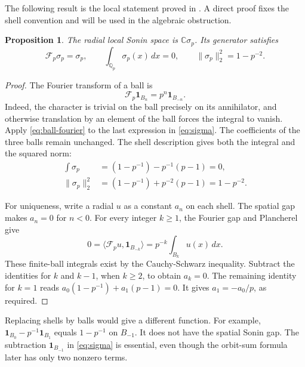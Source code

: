 \documentclass[11pt,letterpaper]{article}
\newtheorem{proposition}[theorem]{Proposition}
\theoremstyle{definition}
\theoremstyle{remark}
\newcommand{\C}{\mathbb C}
\newcommand{\Q}{\mathbb Q}
\newcommand{\ind}{\mathbf1}
\begin{document}
The following result is the local statement proved in
\cite[Section 4.5]{CCM}. A direct proof fixes the shell convention and
will be used in the algebraic obstruction.

\begin{proposition}\label{prop:local-sonin}
The radial local Sonin space is $\C\sigma_p$. Its generator satisfies
\begin{equation}\label{eq:sigma-properties}
 \mathscr F_p\sigma_p=\sigma_p,\qquad
 \int_{\Q_p}\sigma_p(x)\,dx=0,\qquad
 \|\sigma_p\|_2^2=1-p^{-2}.
\end{equation}
\end{proposition}

\begin{proof}
The Fourier transform of a ball is
\begin{equation}\label{eq:ball-fourier}
 \mathscr F_p\ind_{B_n}=p^n\ind_{B_{-n}}.
\end{equation}
Indeed, the character is trivial on the ball precisely on its
annihilator, and otherwise translation by an element of the ball forces
the integral to vanish. Apply \eqref{eq:ball-fourier} to the last
expression in \eqref{eq:sigma}. The coefficients of the three balls
remain unchanged. The shell description gives both the integral and
the squared norm:
\begin{align}
 \int\sigma_p&=(1-p^{-1})-p^{-1}(p-1)=0,\nonumber\\
 \|\sigma_p\|_2^2&=(1-p^{-1})+p^{-2}(p-1)=1-p^{-2}.
 \label{eq:sigma-norm-derivation}
\end{align}

For uniqueness, write a radial $u$ as a constant $a_n$ on each shell.
The spatial gap makes $a_n=0$ for $n<0$. For every integer $k\ge1$,
the Fourier gap and Plancherel give
\begin{equation}\label{eq:radial-moment}
 0=\langle\mathscr F_pu,\ind_{B_{-k}}\rangle
   =p^{-k}\int_{B_k}u(x)\,dx.
\end{equation}
These finite-ball integrals exist by the Cauchy-Schwarz inequality. Subtract the
identities for $k$ and $k-1$, when $k\ge2$, to obtain $a_k=0$.
The remaining identity for $k=1$ reads
$a_0(1-p^{-1})+a_1(p-1)=0$. It gives $a_1=-a_0/p$, as required.
\end{proof}

Replacing shells by balls would give a different function.
For example, $\ind_{B_0}-p^{-1}\ind_{B_1}$ equals $1-p^{-1}$ on
$B_{-1}$. It does not have the spatial Sonin gap. The subtraction
$\ind_{B_{-1}}$ in \eqref{eq:sigma} is essential, even though the
orbit-sum formula later has only two nonzero terms.
\end{document}
